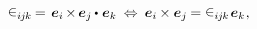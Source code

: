 \nopagebreak\vspace{-0.3em}\begin{equation*}
\levicivita_{i\hspace{-0.1ex}j\hspace{-0.1ex}k} \hspace{-0.15ex} = \hspace{.15ex}
\hspace{.1ex} \bm{e}_i \hspace{-0.2ex} \times \hspace{-0.2ex} \bm{e}_j \hspace{-0.1ex} \dotp \hspace{.12ex} \bm{e}_k
\:\Leftrightarrow\:
\bm{e}_i \hspace{-0.1ex} \times \bm{e}_j \hspace{-0.12ex}
= \levicivita_{i\hspace{-0.1ex}j\hspace{-0.1ex}k} \hspace{.2ex} \bm{e}_k
\hspace{.1ex} ,
\end{equation*}\vspace{-1.6em}
